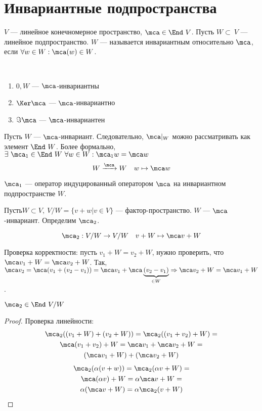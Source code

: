 \documentclass[main]{subfiles}
\begin{document}
\chapter{Инвариантные подпространства}

\begin{definition}
    $V$ — линейное конечномерное пространство, $\mca\in \End \ V$. Пусть $W\subset \ V$ — линейное подпространство.
    $W$ — называется инвариантным относительно $\mca$, если $\forall w\in W : \mca(w) \in W$.
\end{definition}

\begin{propertylist}
    \
    \begin{enumerate}
        \item $0, W$ — $\mca$-инвариантны
        \item $\Ker \mca$ — $\mca$-инвариантно
        \item $\Im \mca$ — $\mca$-инвариантен
    \end{enumerate}
\end{propertylist}



Пусть $W$ — $\mca$-инвариант. Следовательно, $\mca|_W$ можно рассматривать как элемент $\End \ W$.
Более формально, $\exists\  \mca_1 \in \End \ W \ \forall w \in W : \mca_1 w=\mca w$
\[W\xrightarrow{\mca} W \quad w\mapsto \mca w\]

$\mca_1$  —  оператор индуцированный оператором $\mca$ на инвариантном подпространстве $W$.

$Пусть W\subset V,\ V/W = \{ v+w |v \in V\}$ — фактор-пространство.  $W$ — $\mca$-инвариант.
Определим $\mca_2$.

\[\mca_2: V/W \rightarrow V/W \quad v+W \mapsto \mca v+W\]

Проверка корректности: пусть $v_1+W = v_2+W$, нужно проверить, что $\mca v_1+W=\mca v_2 + W$. Так, $\mca v_2= \mca(v_1+(v_2-v_1))=\mca v_1+ \mca\underbrace{(v_2-v_1)}_{\in W} \Rightarrow
    \mca v_2 + W= \mca v_1+W$.

\begin{proposition} {}
    $\mca_2 \in \End \ V/W$
\end{proposition}

\begin{proof}
    Проверка линейности:
    \begin{multline*}
        \mca_2((v_1+W)+(v_2+W))= \mca_2((v_1+v_2)+W)=\\
        \mca(v_1+v_2)+W=  \mca v_1+\mca v_2+W=\\
        (\mca v_1+W)+(\mca v_2+W)
    \end{multline*}
    \begin{multline*}
        \mca_2(\alpha(v+w))= \mca_2(\alpha v+W)=\\
        \mca(\alpha v)+W= \alpha \mca v +W=\\
        \alpha(\mca v +W) = \alpha \mca_2(v+W)
    \end{multline*}
\end{proof}
\end{document}
